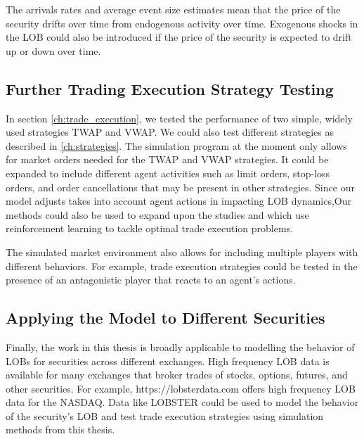 The arrivals rates and average event size estimates mean that the price of the security drifts over time from endogenous activity over time. Exogenous shocks in the LOB could also be introduced if the price of the security is expected to drift up or down over time. 

\subsection{Further Trading Execution Strategy Testing}
In section \ref{ch:trade_execution}, we tested the performance of two simple, widely used strategies TWAP and VWAP. We could also test different strategies as described in \ref{ch:strategies}. The simulation program at the moment only allows for market orders needed for the TWAP and VWAP strategies. It could be expanded to include different agent activities such as limit orders, stop-loss orders, and order cancellations that may be present in other strategies. Since our model adjusts takes into account agent actions in impacting LOB dynamics,Our methods could also be used to expand upon the studies \cite{A3} and \cite{A4} which use reinforcement learning to tackle optimal trade execution problems.

The simulated market environment also allows for including multiple players with different behaviors. For example, trade execution strategies could be tested in the presence of an antagonistic player that reacts to an agent's actions.

\subsection{Applying the Model to Different Securities}
Finally, the work in this thesis is broadly applicable to modelling the behavior of LOBs for securities across different exchanges. High frequency LOB data is available for many exchanges that broker trades of stocks, options, futures, and other securities. For example, https://lobsterdata.com offers high frequency LOB data for the NASDAQ. Data like LOBSTER could be used to model the behavior of the security's LOB and test trade execution strategies using simulation methods from this thesis.